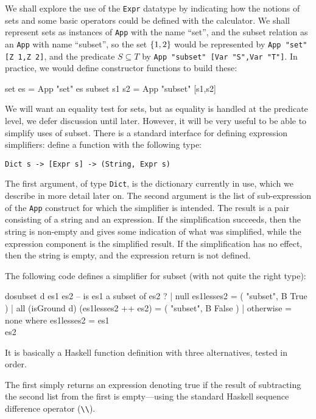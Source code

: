 We shall explore the use of the \texttt{Expr}  datatype
by indicating how the notions of sets and some basic operators
could be defined with the calculator.
We shall represent sets as instances of \texttt{App} with the name ``set'',
and the subset relation as an \texttt{App} with name ``subset'',
so the set $\{{1,2}\}$ would be represented by
\verb$App "set" [Z 1,Z 2]$,
and the predicate $S \subseteq T$ by
\verb$App "subset" [Var "S",Var "T"]$.
In practice, we would define constructor functions to build
these:
\begin{code}
set es = App "set" es
subset s1 s2 = App "subset" [s1,s2]
\end{code}
We will want an equality test for sets,
but as equality is handled at the predicate level, we defer discussion until later.
However, it will be very useful to be able to simplify
uses of subset.
There is a standard interface for defining expression simplifiers:
define a function with the following type:
\begin{verbatim}
Dict s -> [Expr s] -> (String, Expr s)
\end{verbatim}
The first argument, of type \texttt{Dict},
is the dictionary currently in use,
which we describe in more detail later on.
The second argument is the list of sub-expression of
the \texttt{App} construct for which the simplifier is intended.
The result is a pair consisting of a string and an expression.
If the simplification succeeds, then the string is non-empty
and gives some indication
of what was simplified,
while the expression component is the simplified result.
If the simplification has no effect, then the string is empty,
and the expression return is not defined.

The following code defines a simplifier for subset
(with not quite the right type):
\begin{code}
dosubset d es1 es2 -- is es1 a subset of es2 ?
  | null es1lesses2  =  ( "subset", B True )
  | all (isGround d) (es1lesses2 ++ es2)
                     =  ( "subset", B False )
  | otherwise        =  none
  where
    es1lesses2 = es1 \\ es2
\end{code}
It is basically a Haskell function definition with three alternatives,
tested in order.

The first simply returns an expression denoting true
if the result of subtracting the second list from the first
is empty---using the standard Haskell sequence difference operator (\verb$\\$).

